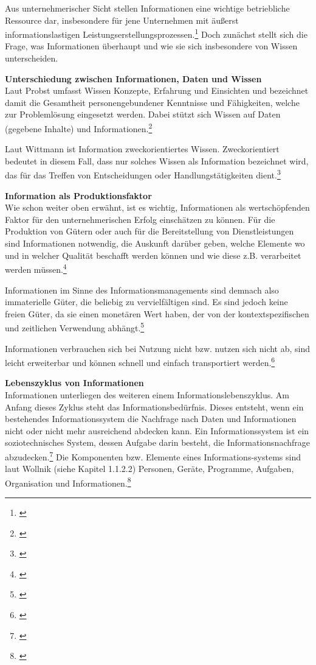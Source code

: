 Aus unternehmerischer Sicht stellen Informationen eine wichtige betriebliche Ressource dar, insbesondere für jene Unternehmen mit äußerst informationslastigen Leistungserstellungsprozessen.\footnote{\cite{BiethanMukschRusch_Informationsmanagement_2004}}
Doch zunächst stellt sich die Frage, was Informationen überhaupt und wie sie sich insbesondere von Wissen unterscheiden.

\textbf{Unterschiedung zwischen Informationen, Daten und Wissen}\\
Laut Probst umfasst Wissen Konzepte, Erfahrung und Einsichten und bezeichnet damit die Gesamtheit personengebundener Kenntnisse und Fähigkeiten, welche zur Problemlösung eingesetzt werden. Dabei stützt sich Wissen auf Daten (gegebene Inhalte) und Informationen.\footnote{\cite{probst_wissen_2006}}

Laut Wittmann ist Information zweckorientiertes Wissen. Zweckorientiert bedeutet in diesem Fall, dass nur solches Wissen als Information bezeichnet wird, das für das Treffen von Entscheidungen oder Handlungstätigkeiten dient.\footnote{\cite{wittmann_unternehmung_1959}}

\textbf{Information als Produktionsfaktor}\\
Wie schon weiter oben erwähnt, ist es wichtig, Informationen als wertschöpfenden Faktor für den unternehmerischen Erfolg einschätzen zu können. Für die Produktion von Gütern oder auch für die Bereitstellung von Dienstleistungen sind Informationen notwendig, die Auskunft darüber geben, welche Elemente wo und in welcher Qualität beschafft werden können und wie diese z.B. verarbeitet werden müssen.\footnote{\cite{bode_informationsbegriff_1997}}

Informationen im Sinne des Informationsmanagements sind demnach also immaterielle Güter, die beliebig zu vervielfältigen sind. Es sind jedoch keine freien Güter, da sie einen monetären Wert haben, der von der kontextspezifischen und zeitlichen Verwendung abhängt.\footnote{\cite{krcmar_informationsmanagement_2015}}

Informationen verbrauchen sich bei Nutzung nicht bzw. nutzen sich nicht ab, sind leicht erweiterbar und können schnell und einfach transportiert werden.\footnote{\cite{teubner_information_2005}}

\textbf{Lebenszyklus von Informationen}\\
Informationen unterliegen des weiteren einem Informationslebenszyklus. Am Anfang dieses Zyklus steht das Informationsbedürfnis. Dieses entsteht, wenn ein bestehendes Informationssystem die Nachfrage nach Daten und Informationen nicht oder nicht mehr ausreichend abdecken kann. Ein Informationssystem ist ein soziotechnisches System, dessen Aufgabe darin besteht, die Informationsnachfrage abzudecken.\footnote{\cite{GluchowskiGabrielDittmar_ManagementSupportSysteme_2008}} Die Komponenten bzw. Elemente eines Informations-systems sind laut Wollnik (siehe Kapitel 1.1.2.2) Personen, Geräte, Programme, Aufgaben, Organisation und Informationen.\footnote{\cite[34-43]{wollnik_informationsmanagement_1988}}

